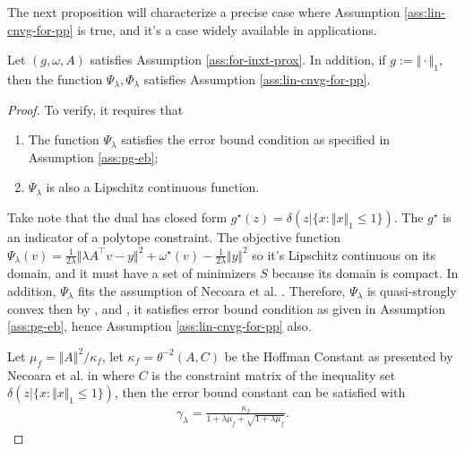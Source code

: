 \documentclass[12pt]{article}
\begin{document}
        The next proposition will characterize a precise case where Assumption \ref{ass:lin-cnvg-for-pp} is true, and it's a case widely available in applications. 
        \begin{proposition}\label{prop:1nrm-prox-problem}
            Let $(g, \omega, A)$ satisfies Assumption \ref{ass:for-inxt-prox}. 
            In addition, if $g := \Vert \cdot\Vert_1$, then the function $\Psi_\lambda, \Phi_\lambda$ satisfies Assumption \ref{ass:lin-cnvg-for-pp}. 
        \end{proposition}
        \begin{proof}
            To verify, it requires that
            \begin{enumerate}[nosep]
                \item The function $\Psi_\lambda$ satisfies the error bound condition as specified in Assumption \ref{ass:pg-eb}; 
                \item $\Psi_\lambda$ is also a Lipschitz continuous function. 
            \end{enumerate}
            Take note that the dual has closed form $g^\star(z) =\delta(z | \{x : \Vert x\Vert_1 \le 1\})$. 
            The $g^\star$ is an indicator of a polytope constraint. 
            The objective function $\Psi_\lambda(v) = \frac{1}{2\lambda}\Vert \lambda A^\top v - y\Vert^2 + \omega^\star(v) - \frac{1}{2\lambda}\Vert y\Vert^2$ so it's Lipschitz continuous on its domain, and it must have a set of minimizers $S$ because its domain is compact. 
            In addition, $\Psi_\lambda$ fits the assumption of Necoara et al. \cite[Theorem 8]{necoara_linear_2019}. 
            Therefore, $\Psi_\lambda$ is quasi-strongly convex then by \cite[Theorem 4]{necoara_linear_2019}, and \cite[Theorem 7]{necoara_linear_2019}, it satisfies error bound condition as given in Assumption \ref{ass:pg-eb}, hence Assumption \ref{ass:lin-cnvg-for-pp} also. 
            \par
            Let $\mu_f = \Vert A\Vert^2/\kappa_f$, let $\kappa_f = \theta^{-2}(A, C)$ be the Hoffman Constant as presented by Necoara et al. in \cite[Section 4]{necoara_linear_2019} where $C$ is the constraint matrix of the inequality set $\delta(z | \{x : \Vert x\Vert_1 \le 1\})$, then the error bound constant can be satisfied with
            \begin{align*}
                \gamma_\lambda = \frac{\kappa_f}{1 + \lambda\mu_f + \sqrt{1 + \lambda\mu_f}}. 
            \end{align*}
        \end{proof}
\end{document}
